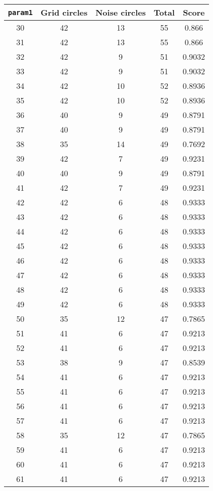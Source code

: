 \documentclass[letterpaper, 12pt]{article}
\begin{document}
\begin{longtable}{|c|c|c|c|c|}
\hline
\textbf{\texttt{param1}} & \textbf{Grid circles} & \textbf{Noise circles} & \textbf{Total} & \textbf{Score} \\
\hline
30 & 42 & 13 & 55 & 0.866 \\
\hline
31 & 42 & 13 & 55 & 0.866 \\
\hline
32 & 42 & 9 & 51 & 0.9032 \\
\hline
33 & 42 & 9 & 51 & 0.9032 \\
\hline
34 & 42 & 10 & 52 & 0.8936 \\
\hline
35 & 42 & 10 & 52 & 0.8936 \\
\hline
36 & 40 & 9 & 49 & 0.8791 \\
\hline
37 & 40 & 9 & 49 & 0.8791 \\
\hline
38 & 35 & 14 & 49 & 0.7692 \\
\hline
39 & 42 & 7 & 49 & 0.9231 \\
\hline
40 & 40 & 9 & 49 & 0.8791 \\
\hline
41 & 42 & 7 & 49 & 0.9231 \\
\hline
42 & 42 & 6 & 48 & 0.9333 \\
\hline
43 & 42 & 6 & 48 & 0.9333 \\
\hline
44 & 42 & 6 & 48 & 0.9333 \\
\hline
45 & 42 & 6 & 48 & 0.9333 \\
\hline
46 & 42 & 6 & 48 & 0.9333 \\
\hline
47 & 42 & 6 & 48 & 0.9333 \\
\hline
48 & 42 & 6 & 48 & 0.9333 \\
\hline
49 & 42 & 6 & 48 & 0.9333 \\
\hline
50 & 35 & 12 & 47 & 0.7865 \\
\hline
51 & 41 & 6 & 47 & 0.9213 \\
\hline
52 & 41 & 6 & 47 & 0.9213 \\
\hline
53 & 38 & 9 & 47 & 0.8539 \\
\hline
54 & 41 & 6 & 47 & 0.9213 \\
\hline
55 & 41 & 6 & 47 & 0.9213 \\
\hline
56 & 41 & 6 & 47 & 0.9213 \\
\hline
57 & 41 & 6 & 47 & 0.9213 \\
\hline
58 & 35 & 12 & 47 & 0.7865 \\
\hline
59 & 41 & 6 & 47 & 0.9213 \\
\hline
60 & 41 & 6 & 47 & 0.9213 \\
\hline
61 & 41 & 6 & 47 & 0.9213 \\

\end{longtable}
\end{document}
